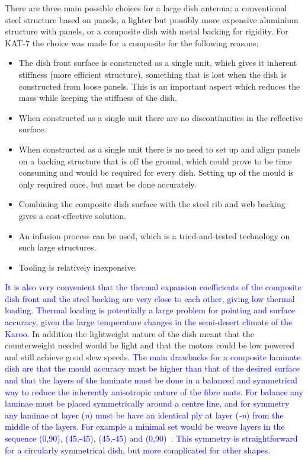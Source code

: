  There are three main possible choices for a large dish antenna; a
 conventional steel structure based on panels, a lighter but possibly
 more expensive aluminium structure with panels, or a composite dish
 with metal backing for rigidity. For KAT-7 the choice was made for a
 composite for the following reasons:

\begin{itemize}
\item The dish front surface is constructed as a single unit, which
  gives it inherent stiffness (more efficient structure), something
  that is lost when the dish is constructed from loose panels.  This
  is an important aspect which reduces the mass while keeping the
  stiffness of the dish.
\item When constructed as a single unit there are no discontinuities
  in the reflective surface.
\item When constructed as a single unit there is no need to set up and
  align panels on a backing structure that is off the ground, which
  could prove to be time consuming and would be required for every
  dish.  Setting up of the mould is only required once, but must be
  done accurately.
\item Combining the composite dish surface with the steel rib and web
  backing gives a cost-effective solution.
\item An infusion process can be used, which is a tried-and-tested
  technology on such large structures.
\item Tooling is relatively inexpensive.

\end{itemize}

\textcolor{blue}{ It is also very convenient that the thermal
  expansion coefficients of the composite dish front and the steel
  backing are very close to each other, giving low thermal
  loading. Thermal loading is potentially a large problem for pointing
  and surface accuracy, given the large temperature changes in the
  semi-desert climate of the Karoo.} 
In addition the lightweight
nature of the dish meant that the counterweight needed would be light
and that the motors could be low powered and still achieve good slew
speeds.  \textcolor{blue}{ The main drawbacks for a composite laminate
  dish are that the mould accuracy must be higher than that of the
  desired surface and that the layers of the laminate must be done in
  a balanced and symmetrical way to reduce the inherently anisotropic
  nature of the fibre mats. For balance any laminae must be placed
  symmetrically around a centre line, and for symmetry any laminae at
  layer (\textit{n}) must be have an identical ply at layer
  (\textit{-n}) from the middle of the layers. For example a minimal
  set would be weave layers in the sequence (0,90), (45,-45), (45,-45)
  and (0,90)\degr\ . This symmetry is straightforward for a
  circularly symmetrical dish, but more complicated for other shapes.}
